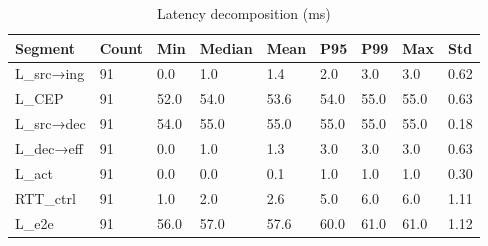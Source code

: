 \begin{table}[htbp]
\centering
\caption{Latency decomposition (ms)}
\label{tab:latency}
\begin{tabular}{lllllllll}
\hline
Segment & Count & Min & Median & Mean & P95 & P99 & Max & Std \\
\hline
L_src→ing & 91 & 0.0 & 1.0 & 1.4 & 2.0 & 3.0 & 3.0 & 0.62 \\
L_CEP & 91 & 52.0 & 54.0 & 53.6 & 54.0 & 55.0 & 55.0 & 0.63 \\
L_src→dec & 91 & 54.0 & 55.0 & 55.0 & 55.0 & 55.0 & 55.0 & 0.18 \\
L_dec→eff & 91 & 0.0 & 1.0 & 1.3 & 3.0 & 3.0 & 3.0 & 0.63 \\
L_act & 91 & 0.0 & 0.0 & 0.1 & 1.0 & 1.0 & 1.0 & 0.30 \\
RTT_ctrl & 91 & 1.0 & 2.0 & 2.6 & 5.0 & 6.0 & 6.0 & 1.11 \\
L_e2e & 91 & 56.0 & 57.0 & 57.6 & 60.0 & 61.0 & 61.0 & 1.12 \\
\hline
\end{tabular}
\end{table}
